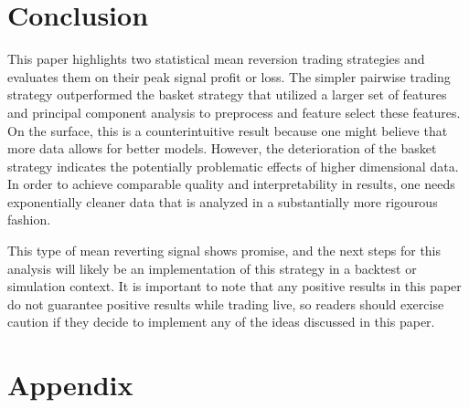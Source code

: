 \documentclass{article}
\begin{document}
\section{Conclusion}
This paper highlights two statistical mean reversion trading strategies and evaluates
them on their peak signal profit or loss. The simpler pairwise trading strategy 
outperformed the basket strategy that utilized a larger set of features and principal
component analysis to preprocess and feature select these features. On the surface, this is a
counterintuitive result because one might believe that more data allows for better 
models. However, the deterioration of the basket strategy indicates the potentially
problematic effects of higher dimensional data. In order to achieve comparable quality
and interpretability in results, one needs exponentially cleaner data that 
is analyzed in a substantially more rigourous fashion. 

This type of mean reverting signal shows promise, and the next steps for this 
analysis will likely be an implementation of this strategy in a backtest or 
simulation context. It is important to note that any positive results in this 
paper do not guarantee positive results while trading live, so readers should
exercise caution if they decide to implement any of the ideas discussed in this paper.

\newpage
\section{Appendix}
\end{document}
